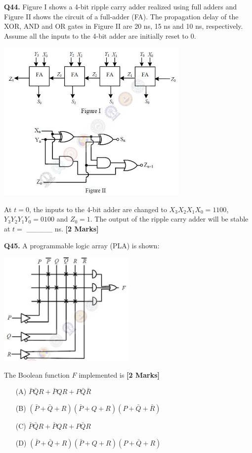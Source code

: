 \documentclass[11pt]{article}
\newcommand{\questionb}[2]{
    \noindent\textbf{Q#2.} #1 \hfill \textbf{[2 Marks]}
}
\begin{document}
\vspace{0.5cm}

\questionb{Figure I shows a 4-bit ripple carry adder realized using full adders and Figure II shows the circuit of a full-adder (FA). The propagation delay of the XOR, AND and OR gates in Figure II are 20 ns, 15 ns and 10 ns, respectively. Assume all the inputs to the 4-bit adder are initially reset to 0.

\begin{center}
\includegraphics[width=0.7\textwidth]{figures/44.png}
\end{center}

At $t = 0$, the inputs to the 4-bit adder are changed to $X_3X_2X_1X_0 = 1100$, $Y_3Y_2Y_1Y_0 = 0100$ and $Z_0 = 1$. The output of the ripple carry adder will be stable at $t = $ \_\_\_\_\_ ns.}{44}

\vspace{0.5cm}

\questionb{A programmable logic array (PLA) is shown:
\begin{center}
\includegraphics[width=0.5\textwidth]{figures/45.png}
\end{center}
The Boolean function $F$ implemented is}{45}
\begin{enumerate}
    \item[(A)] $\bar{P}\bar{Q}R + \bar{P}QR + P\bar{Q}\bar{R}$
    \item[(B)] $(\bar{P}+\bar{Q}+R)(\bar{P}+Q+R)(P+\bar{Q}+\bar{R})$
    \item[(C)] $\bar{P}\bar{Q}R + \bar{P}QR + P\bar{Q}R$
    \item[(D)] $(\bar{P}+\bar{Q}+R)(\bar{P}+Q+R)(P+\bar{Q}+R)$
\end{enumerate}
\end{document}
